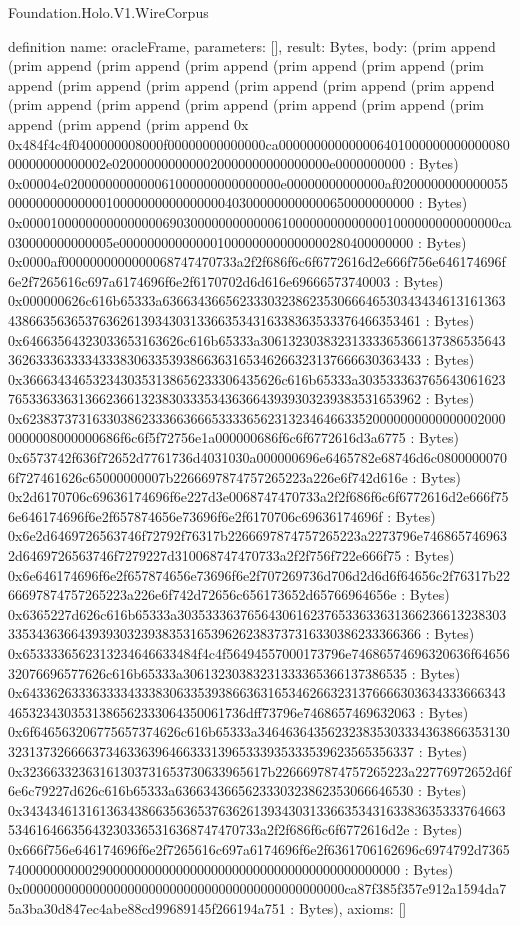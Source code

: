\begin{lexlean}{Foundation.Holo.V1.WireCorpus}
\begin{semanticmodule}
definition{
  name: oracleFrame,
  parameters: [],
  result: Bytes,
  body: (prim append (prim append (prim append (prim append (prim append (prim append (prim append (prim append (prim append (prim append (prim append (prim append (prim append (prim append (prim append (prim append (prim append (prim append (prim append (prim append 0x 0x484f4c4f0400000008000f00000000000000ca00000000000000640100000000000008000000000000002e0200000000000020000000000000000e0000000000 : Bytes) 0x00004e0200000000000061000000000000000e00000000000000af02000000000000550000000000000010000000000000000403000000000000650000000000 : Bytes) 0x00001000000000000000690300000000000061000000000000001000000000000000ca030000000000005e000000000000001000000000000000280400000000 : Bytes) 0x0000af0000000000000068747470733a2f2f686f6c6f6772616d2e666f756e646174696f6e2f7265616c697a6174696f6e2f6170702d6d616e69666573740003 : Bytes) 0x000000626c616b65333a636634366562333032386235306664653034343461316136343866356365376362613934303133663534316338363533376466353461 : Bytes) 0x64663564323033653163626c616b65333a3061323038323133336536613738653564336263336333343338306335393866363165346266323137666630363433 : Bytes) 0x3666343465323430353138656233306435626c616b65333a30353336376564306162376533633631366236613238303335343636643939303239383531653962 : Bytes) 0x6238373731633038623336636665333365623132346466335200000000000000020000000008000000686f6c6f5f72756e1a000000686f6c6f6772616d3a6775 : Bytes) 0x6573742f636f72652d7761736d4031030a000000696e6465782e68746d6c08000000706f727461626c65000000007b2266697874757265223a226e6f742d616e : Bytes) 0x2d6170706c69636174696f6e227d3e0068747470733a2f2f686f6c6f6772616d2e666f756e646174696f6e2f657874656e73696f6e2f6170706c69636174696f : Bytes) 0x6e2d6469726563746f72792f76317b2266697874757265223a2273796e7468657469632d6469726563746f7279227d310068747470733a2f2f756f722e666f75 : Bytes) 0x6e646174696f6e2f657874656e73696f6e2f707269736d706d2d6d6f64656c2f76317b2266697874757265223a226e6f742d72656c656173652d65766964656e : Bytes) 0x6365227d626c616b65333a3035333637656430616237653363363136623661323830333534363664393930323938353165396262383737316330386233366366 : Bytes) 0x6533336562313234646633484f4c4f56494557000173796e74686574696320636f6465632076696577626c616b65333a30613230383231333365366137386535 : Bytes) 0x6433626333633334333830633539386636316534626632313766663036343336663434653234303531386562333064350061736dff73796e7468657469632063 : Bytes) 0x6f646563206775657374626c616b65333a3464636435623238353033343638663531303231373266663734633639646633313965333935333539623565356337 : Bytes) 0x32366332363161303731653730633965617b2266697874757265223a22776972652d6f6e6c79227d626c616b65333a6366343665623330323862353066646530 : Bytes) 0x343434613161363438663563653763626139343031336635343163383635333764663534616466356432303365316368747470733a2f2f686f6c6f6772616d2e : Bytes) 0x666f756e646174696f6e2f7265616c697a6174696f6e2f6361706162696c6974792d736574000000000029000000000000000000000000000000000000000000 : Bytes) 0x0000000000000000000000000000000000000000000000ca87f385f357e912a1594da75a3ba30d847ec4abe88cd99689145f266194a751 : Bytes),
  axioms: []
}


\end{semanticmodule}
\end{lexlean}
